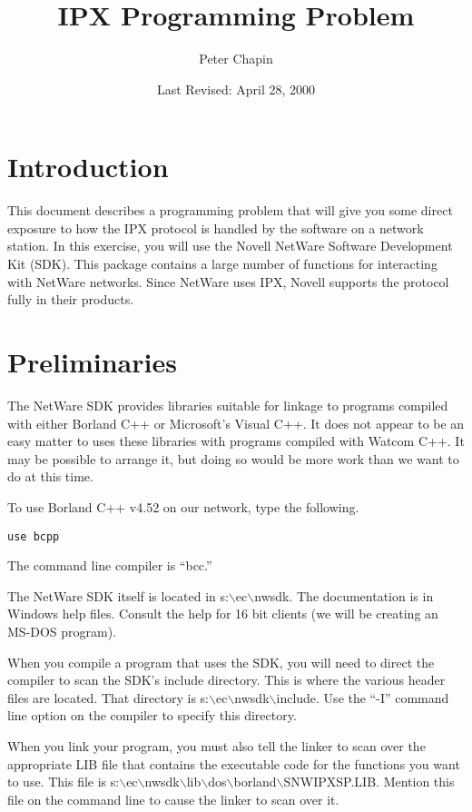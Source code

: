 \documentclass{article}
\begin{document}
\title{IPX Programming Problem}
\author{Peter Chapin}
\date{Last Revised: April 28, 2000}
\maketitle

\section{Introduction}

This document describes a programming problem that will give you some
direct exposure to how the IPX protocol is handled by the software on a
network station. In this exercise, you will use the Novell NetWare
Software Development Kit (SDK). This package contains a large number of
functions for interacting with NetWare networks. Since NetWare uses IPX,
Novell supports the protocol fully in their products.

\section{Preliminaries}

The NetWare SDK provides libraries suitable for linkage to programs
compiled with either Borland C++ or Microsoft's Visual C++. It does not
appear to be an easy matter to uses these libraries with programs
compiled with Watcom C++. It may be possible to arrange it, but doing so
would be more work than we want to do at this time.

To use Borland C++ v4.52 on our network, type the following.

\begin{verbatim}
use bcpp
\end{verbatim}

The command line compiler is ``bcc.''

The NetWare SDK itself is located in s:$\backslash$ec$\backslash$nwsdk.
The documentation is in Windows help files. Consult the help for 16 bit
clients (we will be creating an MS-DOS program).

When you compile a program that uses the SDK, you will need to direct
the compiler to scan the SDK's include directory. This is where the
various header files are located. That directory is
s:$\backslash$ec$\backslash$nwsdk$\backslash$include. Use the ``-I''
command line option on the compiler to specify this directory.

When you link your program, you must also tell the linker to scan over
the appropriate LIB file that contains the executable code for the
functions you want to use. This file is
s:$\backslash$ec$\backslash$nwsdk$\backslash$lib$\backslash$dos$\backslash$borland$\backslash$SNWIPXSP.LIB.
Mention this file on the command line to cause the linker to scan over
it.
\end{document}
